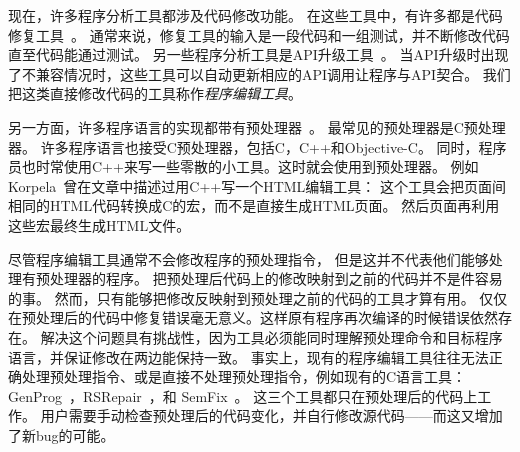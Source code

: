 
\label{sec:intro}


现在，许多程序分析工具都涉及代码修改功能。
在这些工具中，有许多都是代码修复工具~\parencite{le2012genprog,le2012systematic,QiMLDW14,nguyen2013semfix}。
通常来说，修复工具的输入是一段代码和一组测试，并不断修改代码直至代码能通过测试。
另一些程序分析工具是API升级工具~\parencite{li2015swin,Padioleau06,Meng:2011}。
当API升级时出现了不兼容情况时，这些工具可以自动更新相应的API调用让程序与API契合。
我们把这类直接修改代码的工具称作\emph{程序编辑工具}。

另一方面，许多程序语言的实现都带有预处理器~\parencite{ernst2002empirical,kohlbecker1986hygienic,lee2012marco}。
最常见的预处理器是C预处理器。
许多程序语言也接受C预处理器，包括C，C++和Objective-C。
同时，程序员也时常使用C++来写一些零散的小工具。这时就会使用到预处理器。
例如Korpela~\parencite{Korpela2000}曾在文章中描述过用C++写一个HTML编辑工具：
这个工具会把页面间相同的HTML代码转换成C的宏，而不是直接生成HTML页面。
然后页面再利用这些宏最终生成HTML文件。

尽管程序编辑工具通常不会修改程序的预处理指令，
但是这并不代表他们能够处理有预处理器的程序。
把预处理后代码上的修改映射到之前的代码并不是件容易的事。
然而，只有能够把修改反映射到预处理之前的代码的工具才算有用。
仅仅在预处理后的代码中修复错误毫无意义。这样原有程序再次编译的时候错误依然存在。
解决这个问题具有挑战性，因为工具必须能同时理解预处理命令和目标程序语言，并保证修改在两边能保持一致。
事实上，现有的程序编辑工具往往无法正确处理预处理指令、或是直接不处理预处理指令，例如现有的C语言工具：GenProg~\parencite{le2012genprog,le2012systematic}，RSRepair~\parencite{QiMLDW14}，和
SemFix~\parencite{nguyen2013semfix}。
这三个工具都只在预处理后的代码上工作。
用户需要手动检查预处理后的代码变化，并自行修改源代码——而这又增加了新bug的可能。

